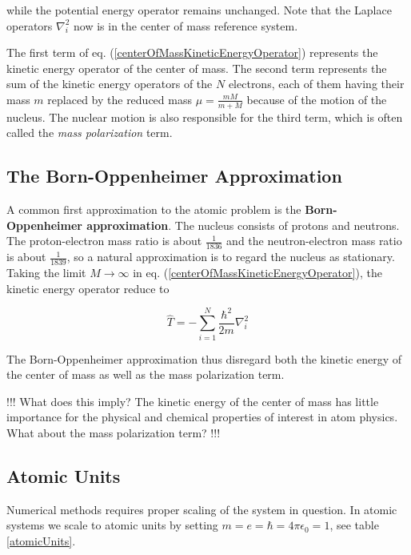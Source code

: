 while the potential energy operator remains unchanged. Note that the
Laplace operators $\nabla^2_i$ now is in the center of mass reference
system. 

The first term of eq. (\ref{centerOfMassKineticEnergyOperator})
represents the kinetic energy operator of the center of mass. The
second term represents the sum of the kinetic energy operators of the
$N$ electrons, each of them having their mass $m$ replaced by the
reduced mass $\mu = \frac{mM}{m+M}$ because of the motion of the
nucleus. The nuclear motion is also responsible for the third term,
which is often called the \emph{mass polarization} term.

\subsection{The Born-Oppenheimer Approximation}

A common first approximation to the atomic problem is the 
{\bf Born-Oppenheimer approximation}. The nucleus consists of protons
and neutrons. The proton-electron mass ratio is about
$\frac{1}{1836}$ and the neutron-electron mass ratio is about
$\frac{1}{1839}$, so a natural approximation is to regard the nucleus
as stationary. Taking the limit $M\to \infty$ in
eq. (\ref{centerOfMassKineticEnergyOperator}), the kinetic energy
operator reduce to

\begin{equation}
  \hat{T} = -\sum_{i=1}^{N}\frac{\hbar^2}{2m}\nabla^2_i
\end{equation}

The Born-Oppenheimer approximation thus disregard both the kinetic
energy of the center of mass as well as the mass polarization term.

!!! What does this imply?
The kinetic energy of the center of mass has little importance for the
physical and chemical properties of interest in atom physics.
What about the mass polarization term?
!!!


\subsection{Atomic Units}

Numerical methods requires proper scaling of the system in
question. In atomic systems we scale to atomic units by setting
$m=e=\hbar=4\pi\epsilon_0=1$, see table \ref{atomicUnits}. 

